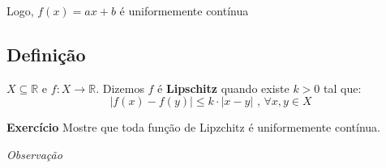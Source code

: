 \documentclass[12pt]{article}
\begin{document}
    Logo, $f(x) = ax+b$ é uniformemente contínua

    \subsection*{Definição}
    $X\subseteq \mathbb{R}$ e $f: X \to \mathbb{R}$. Dizemos $f$ é \textbf{Lipschitz} quando existe $k > 0$ tal que:
    \begin{equation*}
        |f(x) - f(y)| \leq k \cdot |x - y| \text{ , } \forall x,y \in X
    \end{equation*}

    \textbf{Exercício} Mostre que toda função de Lipzchitz é uniformemente contínua.

    \textit{Observação}
\end{document}
